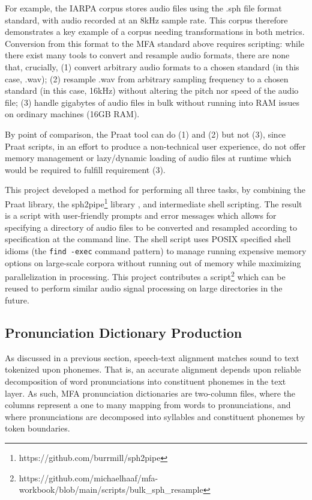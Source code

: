 \documentclass[11pt]{article}
\begin{document}
For example, the IARPA corpus stores audio files using the .sph file format standard, with audio recorded at an 8kHz sample rate. This corpus therefore demonstrates a key example of a corpus needing transformations in both metrics. Conversion from this format to the MFA standard above requires scripting: while there exist many tools to convert and resample audio formats, there are none that, crucially, (1) convert arbitrary audio formats to a chosen standard (in this case, .wav); (2) resample .wav from arbitrary sampling frequency to a chosen standard (in this case, 16kHz) without altering the pitch nor speed of the audio file; (3) handle gigabytes of audio files in bulk without running into RAM issues on ordinary machines (16GB RAM).

By point of comparison, the Praat tool can do (1) and (2) but not (3), since Praat scripts, in an effort to produce a non-technical user experience, do not offer memory management or lazy/dynamic loading of audio files at runtime which would be required to fulfill requirement (3).

This project developed a method for performing all three tasks, by combining the Praat library, the sph2pipe\footnote{https://github.com/burrmill/sph2pipe} library , and intermediate shell scripting. The result is a script with user-friendly prompts and error messages which allows for specifying a directory of audio files to be converted and resampled according to specification at the command line. The shell script uses POSIX specified shell idioms (the \verb|find -exec| command pattern) to manage running expensive memory options on large-scale corpora without running out of memory while maximizing parallelization in processing. This project contributes a script\footnote{https://github.com/michaelhaaf/mfa-workbook/blob/main/scripts/bulk\_sph\_resample} which can be reused to perform similar audio signal processing on large directories in the future.

\subsection{Pronunciation Dictionary Production}

As discussed in a previous section, speech-text alignment matches sound to text tokenized upon phonemes. That is, an accurate alignment depends upon reliable decomposition of word pronunciations into constituent phonemes in the text layer. As such, MFA pronunciation dictionaries are two-column files, where the columns represent a one to many mapping from words to pronunciations, and where pronunciations are decomposed into syllables and constituent phonemes by token boundaries.
\end{document}
